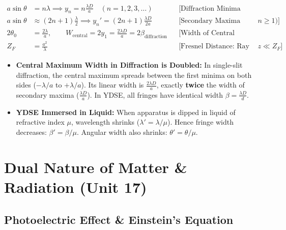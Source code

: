 \documentclass[11pt,a4paper]{article}
\begin{document}
\begin{formulabox}
\begin{align}
  a\sin\theta &= n\lambda \implies y_n = n\frac{\lambda D}{a} \quad (n = 1, 2, 3, \dots) && \text{[Diffraction Minima Condition]} \\
  a\sin\theta &\approx (2n + 1)\frac{\lambda}{2} \implies y_n' = (2n + 1)\frac{\lambda D}{2a} && \text{[Secondary Maxima Condition ($n \ge 1$)]} \\
  2\theta_0 &= \frac{2\lambda}{a}, \qquad W_{\text{central}} = 2y_1 = \frac{2\lambda D}{a} = 2\beta_{\text{diffraction}} && \text{[Width of Central Diffraction Maximum]} \\
  Z_F &= \frac{a^2}{\lambda} && \text{[Fresnel Distance: Ray optics valid for } z \ll Z_F\text{]}
\end{align}
\end{formulabox}

\begin{trapbox}
\begin{itemize}
  \item \textbf{Central Maximum Width in Diffraction is Doubled:} In single-slit diffraction, the central maximum spreads between the first minima on both sides ($-\lambda/a$ to $+\lambda/a$). Its linear width is $\frac{2\lambda D}{a}$, exactly \textbf{twice} the width of secondary maxima ($\frac{\lambda D}{a}$). In YDSE, all fringes have identical width $\beta = \frac{\lambda D}{d}$.
  \item \textbf{YDSE Immersed in Liquid:} When apparatus is dipped in liquid of refractive index $\mu$, wavelength shrinks ($\lambda' = \lambda/\mu$). Hence fringe width decreases: $\beta' = \beta/\mu$. Angular width also shrinks: $\theta' = \theta/\mu$.
\end{itemize}
\end{trapbox}

\newpage

\section{Dual Nature of Matter \& Radiation (Unit 17)}

\subsection{Photoelectric Effect \& Einstein's Equation}
\end{document}
